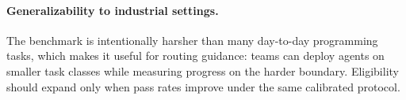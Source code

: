 \paragraph{Generalizability to industrial settings.}
The benchmark is intentionally harsher than many day-to-day programming tasks, which makes it useful for routing guidance: teams can deploy agents on smaller task classes while measuring progress on the harder boundary. Eligibility should expand only when pass rates improve under the same calibrated protocol.
